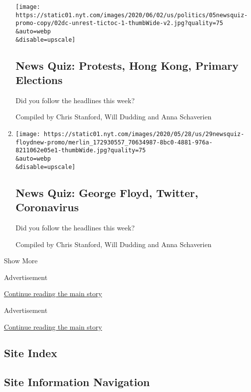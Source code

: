 \begin{enumerate}
  \texttt{[image: https://static01.nyt.com/images/2020/06/02/us/politics/05newsquiz-promo-copy/02dc-unrest-tictoc-1-thumbWide-v2.jpg?quality=75\\\&auto=webp\\\&disable=upscale]}

  \hypertarget{news-quiz-protests-hong-kong-primary-elections}{%
  \subsection{News Quiz: Protests, Hong Kong, Primary
  Elections}\label{news-quiz-protests-hong-kong-primary-elections}}

  Did you follow the headlines this week?

  Compiled by Chris Stanford, Will Dudding and Anna Schaverien
\item
  \href{/interactive/2020/05/29/briefing/george-floyd-twitter-coronavirus-news-quiz.html}{}

  \texttt{[image: https://static01.nyt.com/images/2020/05/28/us/29newsquiz-floydnew-promo/merlin\_172930557\_70634987-8bc0-4881-976a-8211062e05e1-thumbWide.jpg?quality=75\\\&auto=webp\\\&disable=upscale]}

  \hypertarget{news-quiz-george-floyd-twitter-coronavirus}{%
  \subsection{News Quiz: George Floyd, Twitter,
  Coronavirus}\label{news-quiz-george-floyd-twitter-coronavirus}}

  Did you follow the headlines this week?

  Compiled by Chris Stanford, Will Dudding and Anna Schaverien
\end{enumerate}

Show More

Advertisement

\protect\hyperlink{after-mid1}{Continue reading the main story}

Advertisement

\protect\hyperlink{after-mktg}{Continue reading the main story}

\hypertarget{site-index}{%
\subsection{Site Index}\label{site-index}}

\hypertarget{site-information-navigation}{%
\subsection{Site Information
Navigation}\label{site-information-navigation}}

